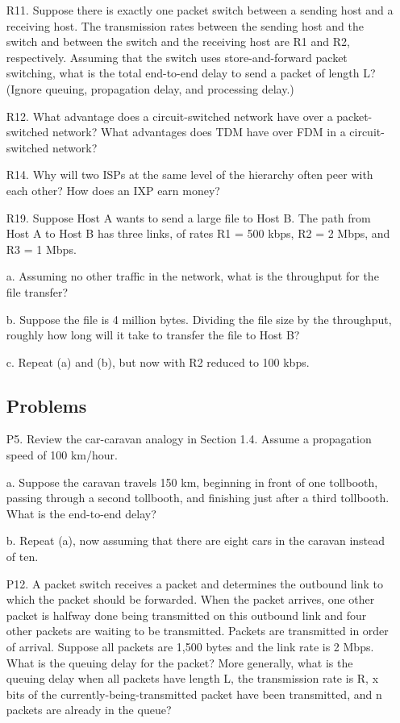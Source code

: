 \documentclass[]{article}
\begin{document}
\begin{enumerate}
	\item[R11.]
	Suppose there is exactly one packet switch between a sending host and a
	receiving host. The transmission rates between the sending host and the
	switch and between the switch and the receiving host are R1 and R2, respectively. Assuming that the switch uses store-and-forward packet switching,
	what is the total end-to-end delay to send a packet of length L? (Ignore
	queuing, propagation delay, and processing delay.)
	
	\item[R12.]
	What advantage does a circuit-switched network have over a packet-switched
	network? What advantages does TDM have over FDM in a circuit-switched
	network?
	
	\item[R14.]
	Why will two ISPs at the same level of the hierarchy often peer with each
	other? How does an IXP earn money?
	
	\item[R19.]
	Suppose Host A wants to send a large file to Host B. The path from Host A to
	Host B has three links, of rates R1 = 500 kbps, R2 = 2 Mbps, and R3 = 1 Mbps.
	
	a. Assuming no other traffic in the network, what is the throughput for the
	file transfer?
	
	b. Suppose the file is 4 million bytes. Dividing the file size by the throughput,
	roughly how long will it take to transfer the file to Host B?
	
	c. Repeat (a) and (b), but now with R2 reduced to 100 kbps.
	
	\subsection{Problems}
	\item[P5.]
	Review the car-caravan analogy in Section 1.4. Assume a propagation speed
	of 100 km/hour.
	
	a. Suppose the caravan travels 150 km, beginning in front of one tollbooth,
	passing through a second tollbooth, and finishing just after a third tollbooth. What is the end-to-end delay?
	
	b. Repeat (a), now assuming that there are eight cars in the caravan instead
	of ten.
	
	\item[P12.]
	A packet switch receives a packet and determines the outbound link to which
	the packet should be forwarded. When the packet arrives, one other packet is
	halfway done being transmitted on this outbound link and four other packets
	are waiting to be transmitted. Packets are transmitted in order of arrival.
	Suppose all packets are 1,500 bytes and the link rate is 2 Mbps. What is the
	queuing delay for the packet? More generally, what is the queuing delay
	when all packets have length L, the transmission rate is R, x bits of the
	currently-being-transmitted packet have been transmitted, and n packets are
	already in the queue?
	

\end{enumerate}
\end{document}
